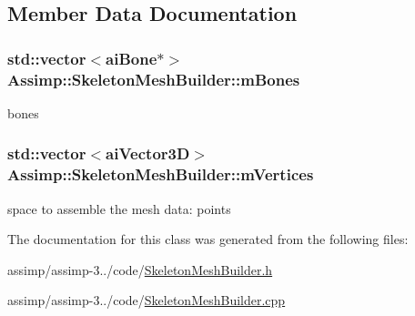 \subsection{Member Data Documentation}
\hypertarget{class_assimp_1_1_skeleton_mesh_builder_a94a9a2741d6375f7ce63afed1c827dac}{
\subsubsection[{m\+Bones}]{\setlength{\rightskip}{0pt plus 5cm}std\+::vector$<${\bf ai\+Bone}$\ast$$>$ Assimp\+::\+Skeleton\+Mesh\+Builder\+::m\+Bones\hspace{0.3cm}{\ttfamily [protected]}}}\label{class_assimp_1_1_skeleton_mesh_builder_a94a9a2741d6375f7ce63afed1c827dac}
bones \hypertarget{class_assimp_1_1_skeleton_mesh_builder_a3536442452bd5f00b8de9e34d6556ab0}{
\subsubsection[{m\+Vertices}]{\setlength{\rightskip}{0pt plus 5cm}std\+::vector$<${\bf ai\+Vector3\+D}$>$ Assimp\+::\+Skeleton\+Mesh\+Builder\+::m\+Vertices\hspace{0.3cm}{\ttfamily [protected]}}}\label{class_assimp_1_1_skeleton_mesh_builder_a3536442452bd5f00b8de9e34d6556ab0}
space to assemble the mesh data\+: points 

The documentation for this class was generated from the following files\+:\begin{DoxyCompactItemize}
\item 
assimp/assimp-\/3../code/\hyperlink{_skeleton_mesh_builder_8h}{Skeleton\+Mesh\+Builder.\+h}\item 
assimp/assimp-\/3../code/\hyperlink{_skeleton_mesh_builder_8cpp}{Skeleton\+Mesh\+Builder.\+cpp}\end{DoxyCompactItemize}
